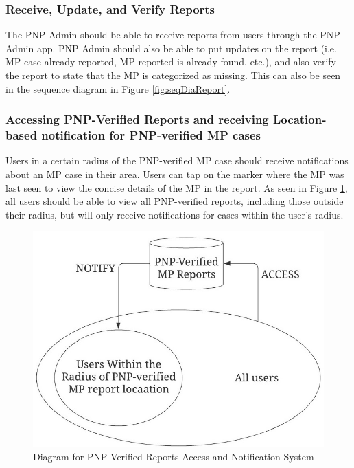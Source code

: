 \subsubsection{Receive, Update, and Verify Reports}

The PNP Admin should be able to receive reports from users through the PNP Admin app. PNP Admin should also be able to put updates on the report (i.e. MP case already reported, MP reported is already found, etc.), and also verify the report to state that the MP is categorized as missing. This can also be seen in the sequence diagram in Figure \ref{fig:seqDiaReport}. 

\subsubsection{Accessing PNP-Verified Reports and receiving Location-based notification for PNP-verified MP cases}

Users in a certain radius of the PNP-verified MP case  should receive notifications about an MP case in their area. Users can tap on the marker where the MP was last seen to view the concise details of the MP in the report. As seen in Figure \ref{fig:diagramLocation}, all users should be able to view all PNP-verified reports, including those outside their radius, but will only receive notifications for cases within the user's radius.

\begin{figure}[!h]
    \centering
    \includegraphics[scale = 1.50]{figures/Chapter3/Chapt3_Diag_locationBasedNotif.jpeg}
    \caption{Diagram for PNP-Verified Reports Access and Notification System}
    \label{fig:diagramLocation}
\end{figure}
